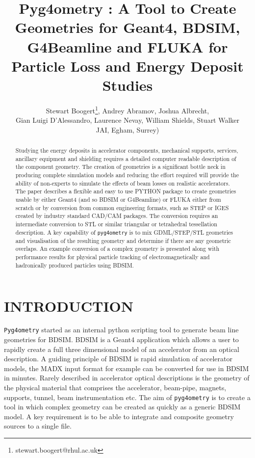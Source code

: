 \documentclass[a4paper,
               keeplastbox,   %
               ]{jacow}
\begin{document}
\title{Pyg4ometry : A Tool to Create Geometries for Geant4, BDSIM, G4Beamline and FLUKA for Particle Loss and Energy Deposit Studies}

\author{Stewart Boogert\thanks{stewart.boogert@rhul.ac.uk}, Andrey Abramov, Joshua Albrecht, \\ Gian Luigi D'Alessandro, Laurence Nevay, William Shields, Stuart Walker \\
JAI, Egham, Surrey)}
	
\maketitle

%
\begin{abstract}
Studying the energy deposits in accelerator components, mechanical supports, services, ancillary equipment and shielding requires a detailed computer readable description of the component geometry. The creation of geometries is a significant bottle neck in producing complete simulation models and reducing the effort required will provide the ability of non-experts to simulate the effects of beam losses on realistic accelerators. The paper describes a flexible and easy to use PYTHON package to create geometries usable by either Geant4 (and so BDSIM or G4Beamline) or FLUKA either from scratch or by conversion from common engineering formats, such as STEP or IGES created by industry standard CAD/CAM packages. The conversion requires an intermediate conversion to STL or similar triangular or tetrahedral tessellation description. A key capability of \verb|pyg4ometry| is to mix GDML/STEP/STL geometries and visualisation of the resulting geometry and determine if there are any geometric overlaps. An example conversion of a complex geometry is presented along with performance results for physical particle tracking of electromagnetically and hadronically produced particles using BDSIM.
\end{abstract}


\section{INTRODUCTION}
\verb|Pyg4ometry| started as an internal python scripting tool to generate beam line geometries for BDSIM. BDSIM is a Geant4 application which allows a user to rapidly create a full three dimensional model of an accelerator from an optical description. A guiding principle of BDSIM is rapid simulation of accelerator models, the MADX input format for example can be converted for use in BDSIM in minutes. Rarely described in accelerator optical descriptions is the geometry of the physical material that comprises the accelerator, beam-pipe, magnets, supports, tunnel, beam instrumentation etc. The aim of \verb|pyg4ometry| is to create a tool  in which complex geometry can be created as quickly as a generic BDSIM model. A key requirement is to be able to integrate and composite geometry sources to a single file.             
\end{document}
